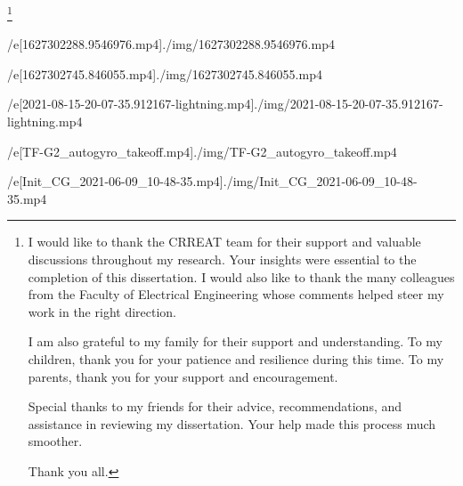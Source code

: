 

\thanks{
I would like to thank the CRREAT team for their support and valuable discussions throughout my research. Your insights were essential to the completion of this dissertation. I would also like to thank the many colleagues from the Faculty of Electrical Engineering whose comments helped steer my work in the right direction.

I am also grateful to my family for their support and understanding. To my children, thank you for your patience and resilience during this time. To my parents, thank you for your support and encouragement.

Special thanks to my friends for their advice, recommendations, and assistance in reviewing my dissertation. Your help made this process much smoother.

Thank you all.
}

\def\mycite[#1]{{\null\def\_addcitelist##1{}\nonumcitations\unskip\cite[#1]}}
\def\specialbibs{\bibnum=1000
   \def\_printbib{\hangindent=2\iindent
      \noindent\hskip2\iindent \llap{[\the\bibmark] }}%
}


\def\printcaption#1#2{\leftskip=\iindent \rightskip=\iindent
   \setbox0=\hbox\bgroup \aftergroup\docaption{\bf#1 #2.}\enspace}
\def\docaption{\tmpdim=\hsize \advance\tmpdim by-2\iindent
   \ifdim\wd0>\tmpdim \unhbox0 \else \hfil\hfil\unhbox0 \fi \endgraf \egroup}




\filedef/e[1627302288.9546976.mp4]{./img/1627302288.9546976.mp4}
\attach[1627302288.9546976.mp4]

\filedef/e[1627302745.846055.mp4]{./img/1627302745.846055.mp4}
\attach[1627302745.846055.mp4]

\filedef/e[2021-08-15-20-07-35.912167-lightning.mp4]{./img/2021-08-15-20-07-35.912167-lightning.mp4}
\attach[2021-08-15-20-07-35.912167-lightning.mp4]

\filedef/e[TF-G2_autogyro_takeoff.mp4]{./img/TF-G2_autogyro_takeoff.mp4}

\filedef/e[Init_CG_2021-06-09_10-48-35.mp4]{./img/Init_CG_2021-06-09_10-48-35.mp4}
\attach[Init_CG_2021-06-09_10-48-35.mp4]

